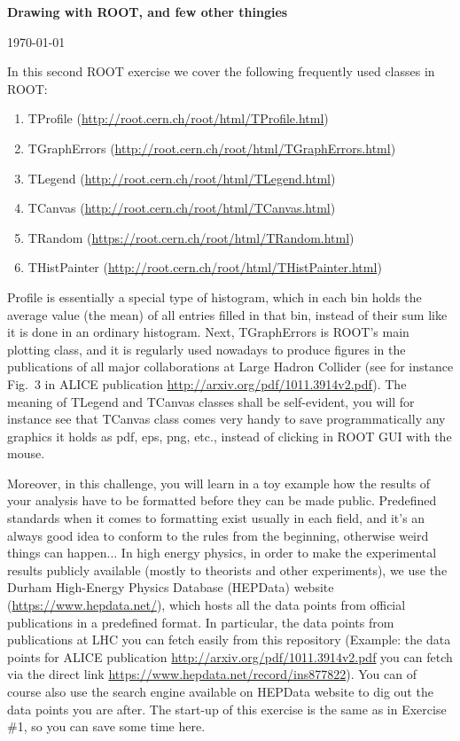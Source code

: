 \documentclass[11pt]{article}
\begin{document}
\begin{center}
\Large{\bf{Drawing with ROOT, and few other thingies}}\\
\end{center}
\begin{center}
{\small\today}
\end{center}

\bigskip

\noindent In this second ROOT exercise we cover the following frequently used classes in ROOT:
%
\begin{enumerate}
\item TProfile (\url{http://root.cern.ch/root/html/TProfile.html})
\item TGraphErrors (\url{http://root.cern.ch/root/html/TGraphErrors.html})
\item TLegend (\url{http://root.cern.ch/root/html/TLegend.html}) 
\item TCanvas (\url{http://root.cern.ch/root/html/TCanvas.html})
\item TRandom (\url{https://root.cern.ch/root/html/TRandom.html})
\item THistPainter (\url{http://root.cern.ch/root/html/THistPainter.html})
\end{enumerate} 
%

Profile is essentially a special type of histogram, which in each bin holds the average value (the mean) of all entries filled in that bin, instead of their sum like it is done in an ordinary histogram. Next, TGraphErrors is ROOT's main plotting class, and it is regularly used nowadays to produce figures in the publications of all major collaborations at Large Hadron Collider (see for instance Fig.~3 in ALICE publication \url{http://arxiv.org/pdf/1011.3914v2.pdf}). The meaning of TLegend and TCanvas classes shall be self-evident, you will for instance see that TCanvas class comes very handy to save programmatically any graphics it holds as pdf, eps, png, etc., instead of clicking in ROOT  GUI with the mouse.

Moreover, in this challenge, you will learn in a toy example how the results of your analysis have to be formatted before they can be made public. Predefined standards when it comes to formatting exist usually in each field, and it's an always good idea to conform to the rules from the beginning, otherwise weird things can happen... In high energy physics, in order to make the experimental results publicly available (mostly to theorists and other experiments), we use the Durham High-Energy Physics Database (HEPData) website (\url{https://www.hepdata.net/}), which hosts all the data points from official publications in a predefined format. In particular, the data points from publications at LHC you can fetch easily from this repository (Example: the data points for ALICE publication \url{http://arxiv.org/pdf/1011.3914v2.pdf} you can fetch via the direct link \url{https://www.hepdata.net/record/ins877822}). You can of course also use the search engine available on HEPData website to dig out the data points you are after. The start-up of this exercise is the same as in Exercise \#1, so you can save some time here. 
\end{document}

